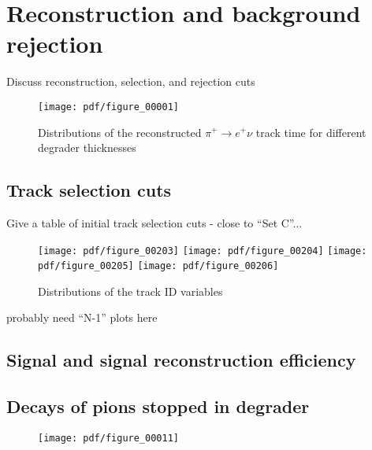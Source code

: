 \section {Reconstruction and background rejection}

Discuss reconstruction, selection, and rejection cuts

\begin{figure}
  \centering
  \texttt{[image: pdf/figure\_00001]}
  \caption{
    \label{fig:pions_timing}
    Distributions of the reconstructed $\pi^+ \to e^+ \nu$ track time for different degrader thicknesses
  }
\end{figure}



\subsection{Track selection cuts}

Give a table of initial track selection cuts - close to ``Set C''...

\begin{figure}[H]
  \texttt{[image: pdf/figure\_00203]}
  \texttt{[image: pdf/figure\_00204]}
  \texttt{[image: pdf/figure\_00205]}
  \texttt{[image: pdf/figure\_00206]}
  \caption{
    Distributions of the track ID variables 
  }
\end{figure}

{\red probably need ``N-1'' plots here}

\subsection{Signal and signal reconstruction efficiency}


\subsection{Decays of pions stopped in degrader}

\begin{figure}[H]
  \texttt{[image: pdf/figure\_00011]}
  \caption{
  }
\end{figure}

